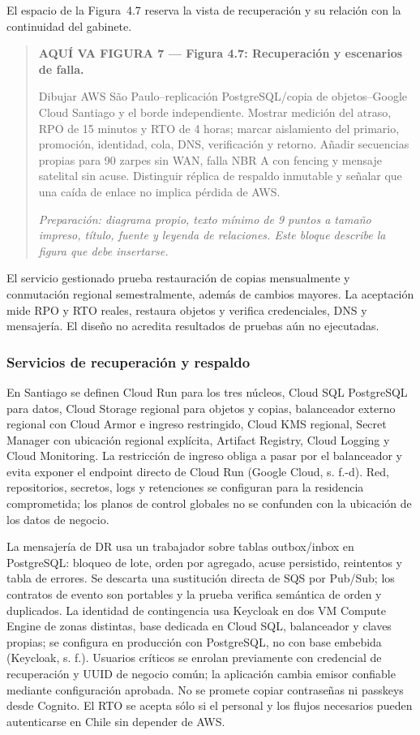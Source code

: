 \documentclass[11pt,letterpaper]{report}
\begin{document}
El espacio de la Figura~4.7 reserva la vista de recuperación y su relación con la continuidad del gabinete.
\par\medskip
\begin{quote}\textbf{AQUÍ VA FIGURA 7 — Figura 4.7: Recuperación y escenarios de falla.}\par Dibujar AWS São Paulo--replicación PostgreSQL/copia de objetos--Google Cloud Santiago y el borde independiente. Mostrar medición del atraso, RPO de 15 minutos y RTO de 4 horas; marcar aislamiento del primario, promoción, identidad, cola, DNS, verificación y retorno. Añadir secuencias propias para 90 zarpes sin WAN, falla NBR A con fencing y mensaje satelital sin acuse. Distinguir réplica de respaldo inmutable y señalar que una caída de enlace no implica pérdida de AWS.\par\textit{Preparación: diagrama propio, texto mínimo de 9 puntos a tamaño impreso, título, fuente y leyenda de relaciones. Este bloque describe la figura que debe insertarse.}\end{quote}
\par\medskip

El servicio gestionado prueba restauración de copias mensualmente y conmutación regional semestralmente, además de cambios mayores. La aceptación mide RPO y RTO reales, restaura objetos y verifica credenciales, DNS y mensajería. El diseño no acredita resultados de pruebas aún no ejecutadas.

\subsubsection*{Servicios de recuperación y respaldo}

En Santiago se definen Cloud Run para los tres núcleos, Cloud SQL PostgreSQL para datos, Cloud Storage regional para objetos y copias, balanceador externo regional con Cloud Armor e ingreso restringido, Cloud KMS regional, Secret Manager con ubicación regional explícita, Artifact Registry, Cloud Logging y Cloud Monitoring. La restricción de ingreso obliga a pasar por el balanceador y evita exponer el endpoint directo de Cloud Run (Google Cloud, s. f.-d). Red, repositorios, secretos, logs y retenciones se configuran para la residencia comprometida; los planos de control globales no se confunden con la ubicación de los datos de negocio.

La mensajería de DR usa un trabajador sobre tablas outbox/inbox en PostgreSQL: bloqueo de lote, orden por agregado, acuse persistido, reintentos y tabla de errores. Se descarta una sustitución directa de SQS por Pub/Sub; los contratos de evento son portables y la prueba verifica semántica de orden y duplicados. La identidad de contingencia usa Keycloak en dos VM Compute Engine de zonas distintas, base dedicada en Cloud SQL, balanceador y claves propias; se configura en producción con PostgreSQL, no con base embebida (Keycloak, s. f.). Usuarios críticos se enrolan previamente con credencial de recuperación y UUID de negocio común; la aplicación cambia emisor confiable mediante configuración aprobada. No se promete copiar contraseñas ni passkeys desde Cognito. El RTO se acepta sólo si el personal y los flujos necesarios pueden autenticarse en Chile sin depender de AWS.
\end{document}
